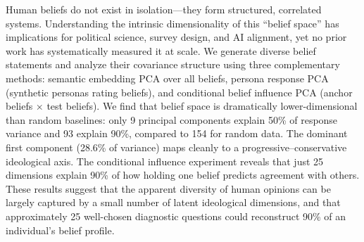 Human beliefs do not exist in isolation---they form structured, correlated systems.
Understanding the intrinsic dimensionality of this ``belief space'' has implications for
political science, survey design, and AI alignment, yet no prior work has systematically
measured it at scale. We generate \nbeliefs diverse belief statements and analyze their
covariance structure using three complementary methods: semantic embedding PCA over all
beliefs, persona response PCA (\npersonas synthetic personas rating \nbeliefsub beliefs),
and conditional belief influence PCA (\nanchors anchor beliefs $\times$ \ntestbeliefs test
beliefs). We find that belief space is dramatically lower-dimensional than random baselines:
only 9 principal components explain 50\% of response variance and 93 explain 90\%, compared
to 154 for random data. The dominant first component (28.6\% of variance) maps cleanly to a
progressive--conservative ideological axis. The conditional influence experiment reveals that
just 25 dimensions explain 90\% of how holding one belief predicts agreement with others.
These results suggest that the apparent diversity of human opinions can be largely captured
by a small number of latent ideological dimensions, and that approximately 25 well-chosen
diagnostic questions could reconstruct 90\% of an individual's belief profile.
